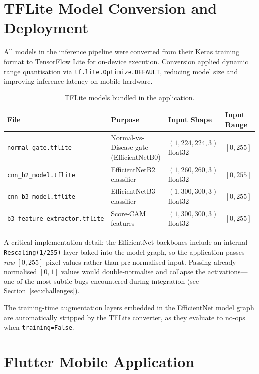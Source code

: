 \section{TFLite Model Conversion and Deployment}
\label{sec:tflite}

All models in the inference pipeline were converted from their Keras training format to TensorFlow Lite for on-device execution. Conversion applied dynamic range quantisation via \texttt{tf.lite.Optimize.DEFAULT}, reducing model size and improving inference latency on mobile hardware.

\begin{table}[H]
\centering
\caption{TFLite models bundled in the application.}
\label{tab:tflite_models}
\begin{tabular}{|l|l|l|l|}
\hline
\textbf{File} & \textbf{Purpose} & \textbf{Input Shape} & \textbf{Input Range} \\ \hline
\texttt{normal\_gate.tflite} & Normal-vs-Disease gate (EfficientNetB0) & $(1, 224, 224, 3)$ float32 & $[0, 255]$ \\ \hline
\texttt{cnn\_b2\_model.tflite} & EfficientNetB2 classifier & $(1, 260, 260, 3)$ float32 & $[0, 255]$ \\ \hline
\texttt{cnn\_b3\_model.tflite} & EfficientNetB3 classifier & $(1, 300, 300, 3)$ float32 & $[0, 255]$ \\ \hline
\texttt{b3\_feature\_extractor.tflite} & Score-CAM features & $(1, 300, 300, 3)$ float32 & $[0, 255]$ \\ \hline
\end{tabular}
\end{table}

A critical implementation detail: the EfficientNet backbones include an internal \texttt{Rescaling(1/255)} layer baked into the model graph, so the application passes \textit{raw} $[0, 255]$ pixel values rather than pre-normalised input. Passing already-normalised $[0, 1]$ values would double-normalise and collapse the activations---one of the most subtle bugs encountered during integration (see Section~\ref{sec:challenges}).

The training-time augmentation layers embedded in the EfficientNet model graph are automatically stripped by the TFLite converter, as they evaluate to no-ops when \texttt{training=False}.


\section{Flutter Mobile Application}
\label{sec:flutter}

